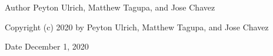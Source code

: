  

\begin{DoxyAuthor}{Author}
Peyton Ulrich, Matthew Tagupa, and Jose Chavez
\end{DoxyAuthor}
\begin{DoxyCopyright}{Copyright}
(c) 2020 by Peyton Ulrich, Matthew Tagupa, and Jose Chavez
\end{DoxyCopyright}
\begin{DoxyDate}{Date}
December 1, 2020 
\end{DoxyDate}
